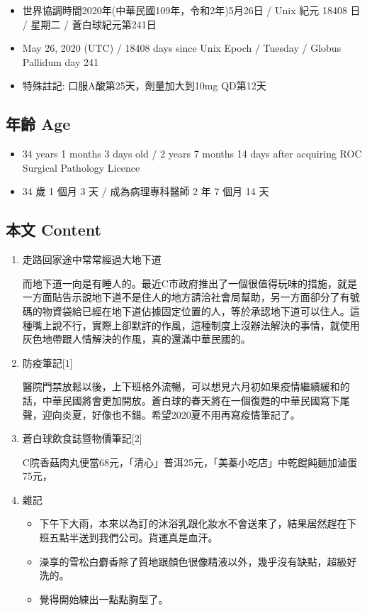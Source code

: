 \documentclass[a5paper, 12pt
]{book}
\providecommand{\tightlist}{%
  \setlength{\itemsep}{0pt}\setlength{\parskip}{0pt}}
\begin{document}
\begin{itemize}
\tightlist
\item
  世界協調時間2020年(中華民國109年，令和2年)5月26日 / Unix 紀元 18408 日
  / 星期二 / 蒼白球紀元第241日
\item
  May 26, 2020 (UTC) / 18408 days since Unix Epoch / Tuesday / Globus
  Pallidum day 241
\item
  特殊註記: 口服A酸第25天，劑量加大到10mg QD第12天
\end{itemize}

\hypertarget{ux5e74ux9f61-age-86}{%
\subsection{年齡 Age}\label{ux5e74ux9f61-age-86}}

\begin{itemize}
\tightlist
\item
  34 years 1 months 3 days old / 2 years 7 months 14 days after
  acquiring ROC Surgical Pathology Licence
\item
  34 歲 1 個月 3 天 / 成為病理專科醫師 2 年 7 個月 14 天
\end{itemize}

\hypertarget{ux672cux6587-content-86}{%
\subsection{本文 Content}\label{ux672cux6587-content-86}}

\begin{enumerate}
\def\labelenumi{\arabic{enumi}.}
\item
  走路回家途中常常經過大地下道

  而地下道一向是有睡人的。最近C市政府推出了一個很值得玩味的措施，就是一方面貼告示說地下道不是住人的地方請洽社會局幫助，另一方面卻分了有號碼的物資袋給已經在地下道佔據固定位置的人，等於承認地下道可以住人。這種嘴上說不行，實際上卻默許的作風，這種制度上沒辦法解決的事情，就使用灰色地帶跟人情解決的作風，真的還滿中華民國的。
\item
  防疫筆記{[}1{]}

  醫院門禁放鬆以後，上下班格外流暢，可以想見六月初如果疫情繼續緩和的話，中華民國將會更加開放。蒼白球的春天將在一個復甦的中華民國寫下尾聲，迎向炎夏，好像也不錯。希望2020夏不用再寫疫情筆記了。
\item
  蒼白球飲食誌暨物價筆記{[}2{]}

  C院香菇肉丸便當68元，「清心」普洱25元，「美蓁小吃店」中乾餛飩麵加滷蛋75元，
\item
  雜記

  \begin{itemize}
  \tightlist
  \item
    下午下大雨，本來以為訂的沐浴乳跟化妝水不會送來了，結果居然趕在下班五點半送到我們公司。貨運真是血汗。
  \item
    澡享的雪松白麝香除了質地跟顏色很像精液以外，幾乎沒有缺點，超級好洗的。
  \item
    覺得開始練出一點點胸型了。
  \end{itemize}
\end{enumerate}
\end{document}
